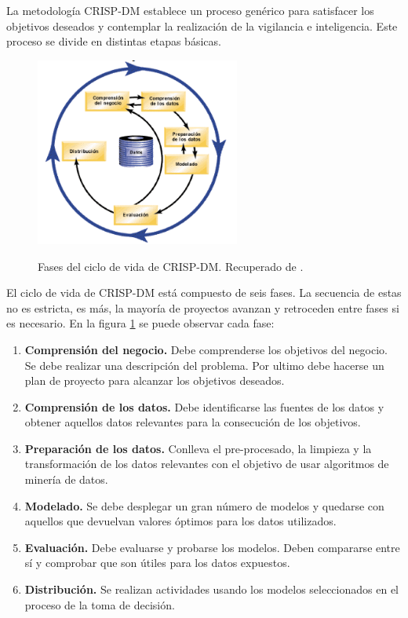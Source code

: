 La metodología CRISP-DM establece un proceso genérico para satisfacer los objetivos deseados y contemplar la realización de la vigilancia e inteligencia. Este proceso se divide en distintas etapas básicas. 

\begin{figure}[h]
\centering
\caption{Fases del ciclo de vida de CRISP-DM. Recuperado de \protect{}.}
 \includegraphics[width=0.6\textwidth]{recursos/CRISPCicloIBM}
\label{fig:CicloCrispDM}
\end{figure}
\FloatBarrier
El ciclo de vida de CRISP-DM está compuesto de seis fases. La secuencia de estas no es estricta, es más, la mayoría de proyectos avanzan y retroceden entre fases si es necesario. En la figura \ref{fig:CicloCrispDM} se puede observar cada fase:

\begin{enumerate}
	\item \textbf{Comprensión del negocio.} Debe comprenderse los objetivos del negocio. Se debe realizar una descripción del problema. Por ultimo debe hacerse un plan de proyecto para alcanzar los objetivos deseados.
	\item \textbf{Comprensión de los datos.} Debe identificarse las fuentes de los datos y obtener aquellos datos relevantes para la consecución de los objetivos.
	\item \textbf{Preparación de los datos.} Conlleva el pre-procesado, la limpieza y la transformación de los datos relevantes con el objetivo de usar algoritmos de minería de datos.
	\item \textbf{Modelado.} Se debe desplegar un gran número de modelos y quedarse con aquellos que devuelvan valores óptimos para los datos utilizados.
	\item \textbf{Evaluación.} Debe evaluarse y probarse los modelos. Deben compararse entre sí y comprobar que son útiles para los datos expuestos.
	\item \textbf{Distribución.} Se realizan actividades usando los modelos seleccionados en el proceso de la toma de decisión.
\end{enumerate}

